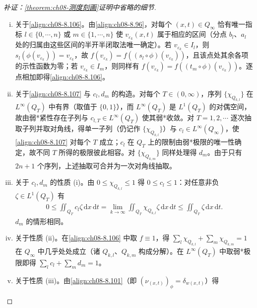 \documentclass[../../main.tex]{subfiles}%
\begin{document}
\begin{proof}[补证：\cref{theorem:ch08-测度刻画}证明中省略的细节]
\begin{enumerate}[(i)]
\item 关于\eqref{align:ch08-8.106}。由\eqref{align:ch08-8.96}，对每个 $(x,t)\in Q_\infty$ 恰有唯一指标 $l\in\{0,\cdots ,n\}$ 或 $m\in\{1,\cdots ,n\}$ 使 $v_{\varepsilon_k}(x,t)$ 属于相应的区间（分点 $b_l$、$a_l$ 处的归属由这些区间的半开半闭取法唯一确定）。若 $v_{\varepsilon_k}\in I_l$，则 $s_l(\phi(v_{\varepsilon_k}))=v_{\varepsilon_k}$，故 $f(v_{\varepsilon_k})=f((s_l\circ\phi)(v_{\varepsilon_k}))$，且该点处其余各项的示性函数为零；若 $v_{\varepsilon_k}\in\widehat I_m$，则同样有 $f(v_{\varepsilon_k})=f((t_m\circ\phi)(v_{\varepsilon_k}))$。逐点相加即得\eqref{align:ch08-8.106}。
\item 关于\eqref{align:ch08-8.107} 与 $c_l,d_m$ 的构造。对每个 $T\in(0,\infty)$，序列 $\{\chi_{Q_{k,l}}\}$ 在 $L^\infty(Q_T)$ 中有界（取值于 $\{0,1\}$），而 $L^\infty(Q_T)$ 是 $L^1(Q_T)$ 的对偶空间，故由弱*紧性存在子列与 $c_{l,T}\in L^\infty(Q_T)$ 使其弱*收敛。对 $T=1,2,\cdots$ 逐次抽取子列并取对角线，得单一子列（仍记作 $\{\chi_{Q_{k,l}}\}$）与 $c_l\in L^\infty(Q_\infty)$，使\eqref{align:ch08-8.107} 对每个 $T$ 成立；$c_l$ 在 $Q_T$ 上的限制由弱*极限的唯一性确定，故不同 $T$ 所得的极限彼此相容。对 $\{\chi_{Q_{k,m}}\}$ 同样处理得 $d_m$。由于只有 $2n+1$ 个序列，上述抽取可合并为一次对角线抽取。
\item 关于 $c_l,d_m$ 的性质 (i)。由 $0\leqslant\chi_{Q_{k,l}}\leqslant1$ 得 $0\leqslant c_l\leqslant1$：对任意非负 $\zeta\in L^1(Q_T)$ 有
\begin{align*}
0\leqslant\iint_{Q_T}c_l\zeta\,\mathrm{d}x\,\mathrm{d}t=\lim_{k\to\infty}\iint_{Q_T}\chi_{Q_{k,l}}\zeta\,\mathrm{d}x\,\mathrm{d}t\leqslant\iint_{Q_T}\zeta\,\mathrm{d}x\,\mathrm{d}t.
\end{align*}
$d_m$ 的情形相同。
\item 关于性质 (ii)。在\eqref{align:ch08-8.106} 中取 $f\equiv1$，得 $\sum_l\chi_{Q_{k,l}}+\sum_m\chi_{Q_{k,m}}=1$ 在 $Q_\infty$ 中几乎处处成立（诸 $Q_{k,l}$、$Q_{k,m}$ 构成分解）。在 $L^\infty(Q_T)$ 中取弱*极限即得 $\sum_lc_l+\sum_md_m=1$。
\item 关于性质 (iii)。由\eqref{align:ch08-8.101}（即 $(\nu_{(x,t)})_\phi=\delta_{w(x,t)}$）得

\end{enumerate}
\end{proof}
\end{document}
